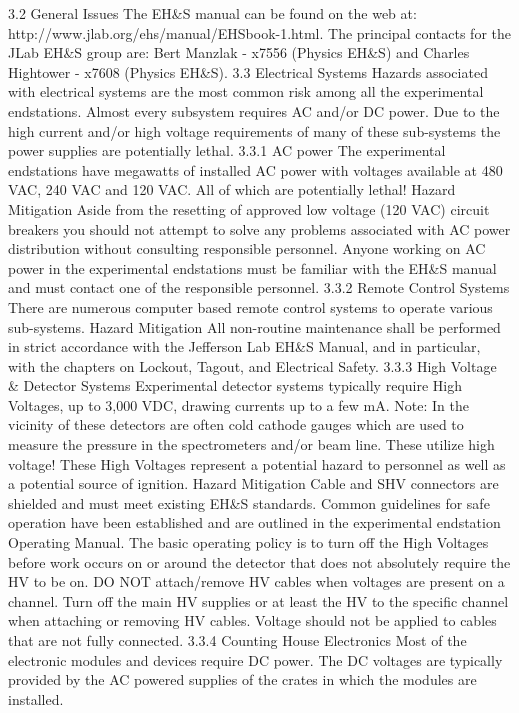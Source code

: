{{{3.2		General Issues
	The EH\&S manual can be found on the web at:
 http://www.jlab.org/ehs/manual/EHSbook-1.html. The principal contacts for the JLab EH\&S group are: Bert Manzlak - x7556 (Physics EH\&S) and Charles Hightower - x7608 (Physics EH\&S).
3.3 		Electrical Systems
	Hazards associated with electrical systems are the most common risk among all the experimental endstations. Almost every subsystem requires AC and/or DC power. Due to the high current and/or high voltage requirements of many of these sub-systems the power supplies are potentially lethal.
3.3.1 		AC power
	The experimental endstations have megawatts of installed AC power with voltages available at 480 VAC, 240 VAC and 120 VAC. All of which are potentially lethal!
Hazard Mitigation 
	Aside from the resetting of approved low voltage (120 VAC) circuit breakers you should not attempt to solve any problems associated with AC power distribution without consulting responsible personnel. Anyone working on AC power in the experimental endstations must be familiar with the EH\&S manual and must contact one of the responsible personnel. 
3.3.2 		Remote Control Systems
	There are numerous computer based remote control systems to operate various sub-systems.
Hazard Mitigation	
	All non-routine maintenance shall be performed in strict accordance with the Jefferson Lab EH\&S Manual, and in particular, with the chapters on Lockout, Tagout, and Electrical Safety.
3.3.3	High Voltage \& Detector Systems
	Experimental detector systems typically require High Voltages, up to 3,000 VDC, drawing currents up to a few mA. Note: In the vicinity of these detectors are often cold cathode gauges which are used to measure the pressure in the spectrometers and/or beam line. These utilize high voltage! These High Voltages represent a potential hazard to personnel as well as a potential source of ignition.
Hazard Mitigation	
	Cable and SHV connectors are shielded and must meet existing EH\&S standards. Common guidelines for safe operation have been established and are outlined in the experimental endstation Operating Manual. The basic operating policy is to turn off the High Voltages before work occurs on or around the detector that does not absolutely require the HV to be on. DO NOT attach/remove HV cables when voltages are present on a channel. Turn off the main HV supplies or at least the HV to the specific channel when attaching or removing HV cables. Voltage should not be applied to cables that are not fully connected.
3.3.4 		Counting House Electronics
	Most of the electronic modules and devices require DC power. The DC voltages are typically provided by the AC powered supplies of the crates in which the modules are installed.
}}}
